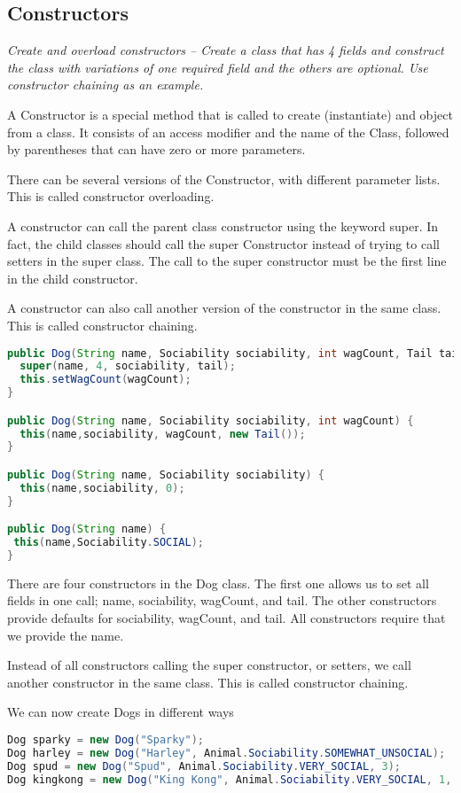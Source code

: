 \subsection{Constructors}
\textit{Create and overload constructors -- Create a class that has 4 fields and construct the class with variations of one required field and the others are optional.  Use constructor chaining as an example.}

A Constructor is a special method that is called to create (instantiate) and object from a class. It consists of an access modifier and the name of the Class, followed by parentheses that can have zero or more parameters.

There can be several versions of the Constructor, with different parameter lists. This is called constructor overloading.

A constructor can call the parent class constructor using the keyword super. In fact, the child classes should call the super Constructor instead of trying to call setters in the super class. The call to the super constructor must be the first line in the child constructor.

A constructor can also call another version of the constructor in the same class. This is called constructor chaining.

\begin{lstlisting}[language=Java]
public Dog(String name, Sociability sociability, int wagCount, Tail tail) {
  super(name, 4, sociability, tail);
  this.setWagCount(wagCount);
}

public Dog(String name, Sociability sociability, int wagCount) {
  this(name,sociability, wagCount, new Tail());
}

public Dog(String name, Sociability sociability) {
  this(name,sociability, 0);
}

public Dog(String name) {
 this(name,Sociability.SOCIAL);
}
\end{lstlisting}

There are four constructors in the Dog class. The first one allows us to set all fields in one call; name, sociability, wagCount, and tail. The other constructors provide defaults for sociability, wagCount, and tail. All constructors require that we provide the name.

Instead of all constructors calling the super constructor, or setters, we call another constructor in the same class. This is called constructor chaining.

We can now create Dogs in different ways
\begin{lstlisting}[language=Java]
Dog sparky = new Dog("Sparky");
Dog harley = new Dog("Harley", Animal.Sociability.SOMEWHAT_UNSOCIAL);
Dog spud = new Dog("Spud", Animal.Sociability.VERY_SOCIAL, 3);
Dog kingkong = new Dog("King Kong", Animal.Sociability.VERY_SOCIAL, 1, new Tail(true, 1));
\end{lstlisting}

